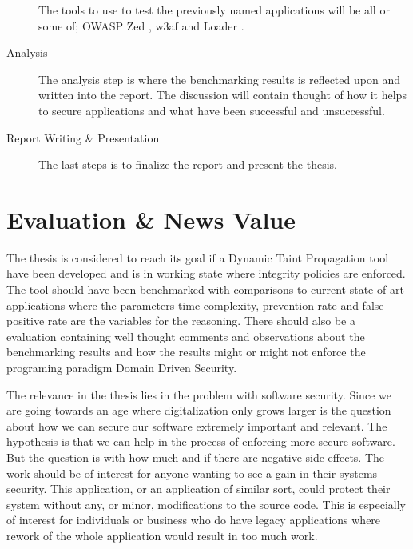 \documentclass{../kththesis}
\begin{document}
\begin{description}
	The tools to use to test the previously named applications will be all or some of; OWASP Zed \parencite{zed}, w3af \parencite{w3af} and Loader \parencite{loader}.

	\item [Analysis]
	The analysis step is where the benchmarking results is reflected upon and written into the report. The discussion will contain thought of how it helps to secure applications and what have been successful and unsuccessful.

	\item [Report Writing \& Presentation]
	The last steps is to finalize the report and present the thesis.
\end{description}



\chapter{Evaluation \& News Value}
The thesis is considered to reach its goal if a Dynamic Taint Propagation tool have been developed and is in working state where integrity policies are enforced. The tool should have been benchmarked with comparisons to current state of art applications where the parameters time complexity, prevention rate and false positive rate are the variables for the reasoning. There should also be a evaluation containing well thought comments and observations about the benchmarking results and how the results might or might not enforce the programing paradigm Domain Driven Security.

The relevance in the thesis lies in the problem with software security. Since we are going towards an age where digitalization only grows larger is the question about how we can secure our software extremely important and relevant. The hypothesis is that we can help in the process of enforcing more secure software. But the question is with how much and if there are negative side effects. The work should be of interest for anyone wanting to see a gain in their systems security. This application, or an application of similar sort, could protect their system without any, or minor, modifications to the source code. This is especially of interest for individuals or business who do have legacy applications where rework of the whole application would result in too much work.
\end{document}
